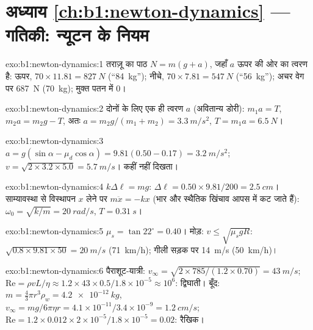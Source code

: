 \section*{अध्याय \ref{ch:b1:newton-dynamics} --- गतिकी: न्यूटन के नियम}

\begin{solution}{exo:b1:newton-dynamics:1}
तराज़ू का पाठ $N = m(g + a)$, जहाँ $a$ ऊपर की ओर का त्वरण है: ऊपर,
$70 \times 11.81 = \qty{827}{N}$ (``\qty{84}{kg}''); नीचे, $70 \times 7.81 =
\qty{547}{N}$ (``\qty{56}{kg}''); अचर वेग पर \qty{687}{N}
(\qty{70}{kg}); मुक्त पतन में $0$।
\end{solution}

\begin{solution}{exo:b1:newton-dynamics:2}
दोनों के लिए एक ही त्वरण $a$ (अवितान्य डोरी): $m_1a = T$,
$m_2a = m_2g - T$, अतः $a = m_2g/(m_1 + m_2) = \qty{3.3}{m/s^2}$,
$T = m_1a = \qty{6.5}{N}$।
\end{solution}

\begin{solution}{exo:b1:newton-dynamics:3}
$a = g(\sin\alpha - \mu_d\cos\alpha) = 9.81(0.50 - 0.17) = \qty{3.2}{m/s^2}$;
$v = \sqrt{2 \times 3.2 \times 5.0} = \qty{5.7}{m/s}$।  कहीं नहीं दिखता।
\end{solution}

\begin{solution}{exo:b1:newton-dynamics:4}
$k\Delta\ell = mg$: $\Delta\ell = 0.50 \times 9.81/200 = \qty{2.5}{cm}$।
साम्यावस्था से विस्थापन $x$ लेने पर $m\ddot x = -kx$ (भार और स्थैतिक खिंचाव
आपस में कट जाते हैं): $\omega_0 = \sqrt{k/m} = \qty{20}{rad/s}$,
$T = \qty{0.31}{s}$।
\end{solution}

\begin{solution}{exo:b1:newton-dynamics:5}
$\mu_s = \tan 22^\circ = 0.40$। मोड़: $v \leq \sqrt{\mu_sgR}$: $\sqrt{0.8
\times 9.81 \times 50} = \qty{20}{m/s}$ (\qty{71}{km/h}); गीली सड़क पर
\qty{14}{m/s} (\qty{50}{km/h})।
\end{solution}

\begin{solution}{exo:b1:newton-dynamics:6}
पैराशूट-यात्री: $v_\infty = \sqrt{2 \times 785/(1.2 \times 0.70)} = \qty{43}{m/s}$;
$\mathrm{Re} = \rho vL/\eta \approx 1.2 \times 43 \times 0.5/1.8\times10^{-5}
\approx 10^6$: द्विघाती। बूँद: $m = \tfrac43\pi r^3\rho_w = \qty{4.2e-12}{kg}$,
$v_\infty = mg/6\pi\eta r = 4.1\times10^{-11}/3.4\times10^{-9} = \qty{1.2}{cm/s}$;
$\mathrm{Re} = 1.2 \times 0.012 \times 2\times10^{-5}/1.8\times10^{-5} = 0.02$:
रैखिक।
\end{solution}

